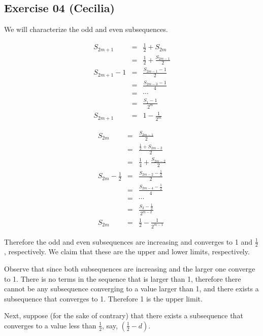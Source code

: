 \subsection*{Exercise 04 (Cecilia)}
We will characterize the odd and even subsequences.

\begin{eqnarray*}
      S_{2m + 1} &=& \frac{1}{2} + S_{2m}             \\
                 &=& \frac{1}{2} + \frac{S_{2m-1}}{2} \\
  S_{2m + 1} - 1 &=& \frac{S_{2m-1} - 1}{2}           \\
                 &=& \frac{S_{2m-3} - 1}{4}           \\
                 &=& \cdots                           \\
                 &=& \frac{S_1 - 1}{2^m}              \\
      S_{2m + 1} &=& 1 - \frac{1}{2^m}
\end{eqnarray*}

\begin{eqnarray*}
                S_{2m} &=& \frac{S_{2m-1}}{2}                \\
                       &=& \frac{\frac{1}{2} + S_{2m-2}}{2}  \\
                       &=& \frac{1}{4} + \frac{S_{2m-2}}{2}  \\
  S_{2m} - \frac{1}{2} &=& \frac{S_{2m-2} - \frac{1}{2}}{2}  \\
                       &=& \frac{S_{2m-4} - \frac{1}{2}}{4}  \\
                       &=& \cdots                            \\
                       &=& \frac{S_2 - \frac{1}{2}}{2^{m-2}} \\
                S_{2m} &=& \frac{1}{2} - \frac{1}{2^{m-1}}
\end{eqnarray*}

Therefore the odd and even subsequences are increasing and converges to 1 and $\frac{1}{2}$, respectively. We claim that these are the upper and lower limits, respectively.

Observe that since both subsequences are increasing and the larger one converge to 1. There is no terms in the sequence that is larger than 1, therefore there cannot be any subsequence converging to a value larger than 1, and there exists a subsequence that converges to 1. Therefore 1 is the upper limit.

Next, suppose (for the sake of contrary) that there exists a subsequence that converges to a value less than $\frac{1}{2}$, say, $ \left(\frac{1}{2} - d\right) $.

